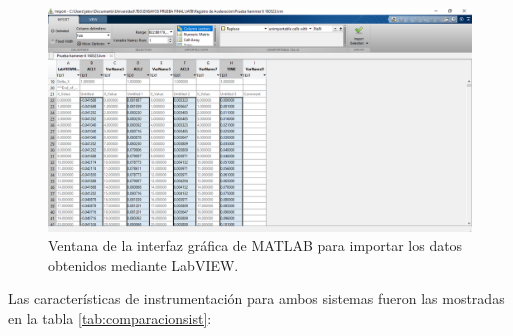 \begin{figure}[H]
    \centering
    \includegraphics[width = \textwidth]{imagenes/cap3_resultados/Ensayos/datosmatlab.png}
    \caption{Ventana de la interfaz gráfica de MATLAB para importar los datos obtenidos mediante LabVIEW.}
    \label{fig:datosmatlab}
\end{figure}

Las características de instrumentación para ambos sistemas fueron las mostradas en la tabla \ref{tab:comparacionsist}:
\begin{table}[H]
    \centering
    \caption{Comparación entre características de los sistemas de medición utilizados.}
    \label{tab:comparacionsist}
    \end{table}

